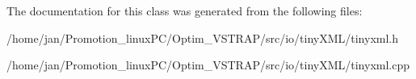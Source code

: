 The documentation for this class was generated from the following files\+:\begin{DoxyCompactItemize}
\item 
/home/jan/\+Promotion\+\_\+linux\+P\+C/\+Optim\+\_\+\+V\+S\+T\+R\+A\+P/src/io/tiny\+X\+M\+L/tinyxml.\+h\item 
/home/jan/\+Promotion\+\_\+linux\+P\+C/\+Optim\+\_\+\+V\+S\+T\+R\+A\+P/src/io/tiny\+X\+M\+L/tinyxml.\+cpp\end{DoxyCompactItemize}
